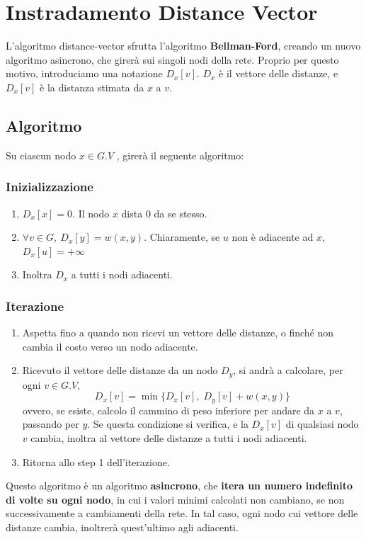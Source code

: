 \newpage

\section{Instradamento Distance Vector}
L'algoritmo distance-vector sfrutta l'algoritmo \textbf{Bellman-Ford}, creando un nuovo algoritmo asincrono, che girerà sui singoli nodi della rete. Proprio per questo motivo, introduciamo una notazione $D_x[v]$. $D_x$ è il vettore delle distanze, e $D_x[v]$ è la distanza stimata da $x$ a $v$.

\subsection{Algoritmo}
Su ciascun nodo $x \in G.V$ , girerà il seguente algoritmo:
\subsubsection{Inizializzazione}
\begin{enumerate}
	\item $D_x[x]=0$. Il nodo $x$ dista 0 da se stesso. 
	
	\item $\forall v \in G, \ D_x[y] =w (x,y)$. Chiaramente, se $u$ non è adiacente ad $x$, $D_x[u]= +\infty$
	
	\item Inoltra $D_x$ a tutti i nodi adiacenti.
\end{enumerate}

\subsubsection{Iterazione}
\begin{enumerate}
	\item Aspetta fino a quando non ricevi un vettore delle distanze, o finché non cambia il costo verso un nodo adiacente.
	
	\item Ricevuto il vettore delle distanze da un nodo $D_y$, si andrà a calcolare, per ogni $v \in G.V$, 
	$$
	D_x[v] = \min \{D_x[v], \;D_y[v] + w(x,y)\}
	$$
	ovvero, se esiste, calcolo il cammino di peso inferiore per andare da $x$ a $v$, passando per $y$. Se questa condizione si verifica, e la $D_x[v]$ di qualsiasi nodo $v$ cambia, inoltra al vettore delle distanze a tutti i nodi adiacenti.
	
	\item Ritorna allo step 1 dell'iterazione.
\end{enumerate}
Questo algoritmo è un algoritmo \textbf{asincrono}, che\textbf{ itera un numero indefinito di volte su ogni nodo}, in cui i valori minimi calcolati non cambiano, se non successivamente a cambiamenti della rete. In tal caso, ogni nodo cui vettore delle distanze cambia, inoltrerà quest'ultimo agli adiacenti.

